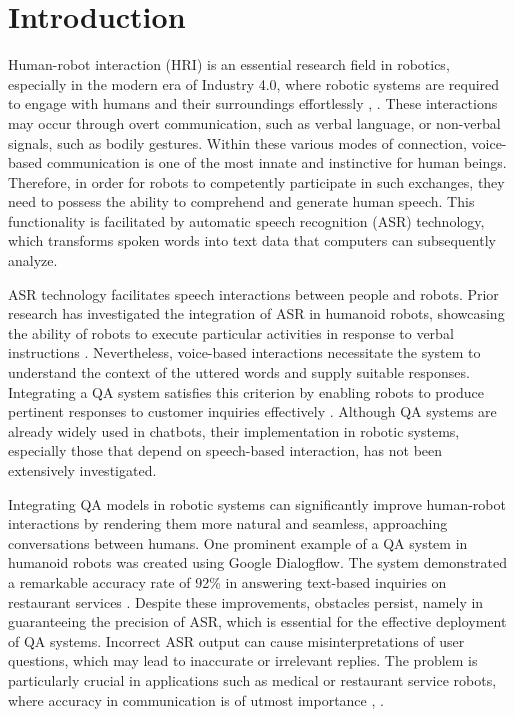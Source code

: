 \documentclass{../styles/svproc}
\begin{document}
\section{Introduction}
Human-robot interaction (HRI) is an essential research field in robotics, especially in the modern era of Industry 4.0, where robotic systems are required to engage with humans and their surroundings effortlessly \cite{Roda-Sanchez2021-rm}, \cite{Angleraud2021-lp}. These interactions may occur through overt communication, such as verbal language, or non-verbal signals, such as bodily gestures. Within these various modes of connection, voice-based communication is one of the most innate and instinctive for human beings. Therefore, in order for robots to competently participate in such exchanges, they need to possess the ability to comprehend and generate human speech. This functionality is facilitated by automatic speech recognition (ASR) technology, which transforms spoken words into text data that computers can subsequently analyze.

ASR technology facilitates speech interactions between people and robots. Prior research has investigated the integration of ASR in humanoid robots, showcasing the ability of robots to execute particular activities in response to verbal instructions \cite{Mawaddah2024-ii}. Nevertheless, voice-based interactions necessitate the system to understand the context of the uttered words and supply suitable responses. Integrating a QA system satisfies this criterion by enabling robots to produce pertinent responses to customer inquiries effectively \cite{Unlu2019-xa}. Although QA systems are already widely used in chatbots, their implementation in robotic systems, especially those that depend on speech-based interaction, has not been extensively investigated.

Integrating QA models in robotic systems can significantly improve human-robot interactions by rendering them more natural and seamless, approaching conversations between humans. One prominent example of a QA system in humanoid robots was created using Google Dialogflow. The system demonstrated a remarkable accuracy rate of 92\% in answering text-based inquiries on restaurant services \cite{Yossy2021-pq}. Despite these improvements, obstacles persist, namely in guaranteeing the precision of ASR, which is essential for the effective deployment of QA systems. Incorrect ASR output can cause misinterpretations of user questions, which may lead to inaccurate or irrelevant replies. The problem is particularly crucial in applications such as medical or restaurant service robots, where accuracy in communication is of utmost importance \cite{Abubakar2020-ha}, \cite{Berezina2019-mk}.
\end{document}
